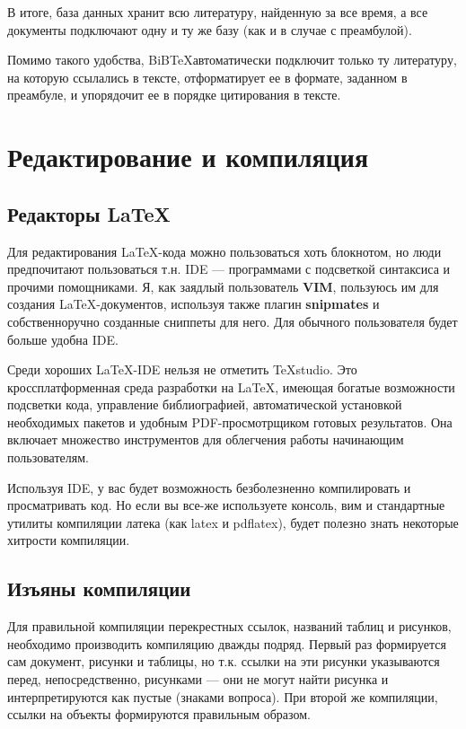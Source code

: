 \inputminted[breaklines,firstline=3,lastline=7,fontsize=\small]{latex}{../web.bib}

В итоге, база данных хранит всю литературу, найденную за все время, а все документы подключают одну и ту же базу (как и в случае с преамбулой).

Помимо такого удобства, BiB\TeX автоматически подключит только ту литературу, на которую ссылались в тексте, отформатирует ее в формате, заданном в преамбуле, и упорядочит ее в порядке цитирования в тексте.

\section{Редактирование и компиляция}

\subsection{Редакторы \LaTeX}

Для редактирования \LaTeX-кода можно пользоваться хоть блокнотом, но люди предпочитают пользоваться т.н. IDE --- программами с подсветкой синтаксиса и прочими помощниками. Я, как заядлый пользователь \textbf{VIM}, пользуюсь им для создания \LaTeX-документов, используя также плагин \textbf{snipmates} и собственноручно созданные сниппеты для него. Для обычного пользователя будет больше удобна IDE.

Среди хороших \LaTeX-IDE нельзя не отметить \TeX studio. Это кроссплатформенная среда разработки на \LaTeX, имеющая богатые возможности подсветки кода, управление библиографией, автоматической установкой необходимых пакетов и удобным PDF-просмотрщиком готовых результатов. Она включает множество инструментов для облегчения работы начинающим пользователям.

Используя IDE, у вас будет возможность безболезненно компилировать и просматривать код. Но если вы все-же используете консоль, вим и стандартные утилиты компиляции латека (как latex и pdflatex), будет полезно знать некоторые хитрости компиляции.

\subsection{Изъяны компиляции}

Для правильной компиляции перекрестных ссылок, названий таблиц и рисунков, необходимо производить компиляцию дважды подряд. Первый раз формируется сам документ, рисунки и таблицы, но т.к. ссылки на эти рисунки указываются перед, непосредственно, рисунками --- они не могут найти рисунка и интерпретируются как пустые (знаками вопроса). При второй же компиляции, ссылки на объекты формируются правильным образом.

